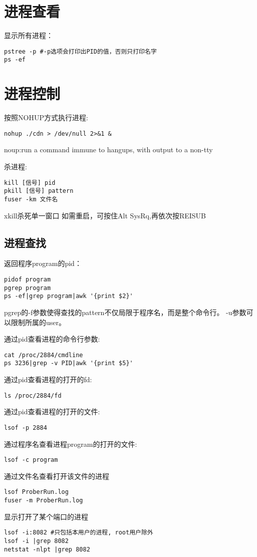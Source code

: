 \section{进程查看}
显示所有进程：
\begin{verbatim}
pstree -p #-p选项会打印出PID的值，否则只打印名字
ps -ef
\end{verbatim}


\section{进程控制}

按照NOHUP方式执行进程:
\begin{verbatim}
nohup ./cdn > /dev/null 2>&1 &
\end{verbatim}
noup:run a command immune to hangups, with output to a non-tty


杀进程:
\begin{verbatim}
kill [信号] pid
pkill [信号] pattern
fuser -km 文件名
\end{verbatim}

xkill杀死单一窗口
如需重启，可按住Alt SysRq,再依次按REISUB


\subsection{进程查找}

返回程序program的pid：
\begin{verbatim}
pidof program 
pgrep program 
ps -ef|grep program|awk '{print $2}'
\end{verbatim}
pgrep的-f参数使得查找的pattern不仅局限于程序名，而是整个命令行。 -u参数可以限制所属的user。

通过pid查看进程的命令行参数:
\begin{verbatim}
cat /proc/2884/cmdline
ps 3236|grep -v PID|awk '{print $5}'
\end{verbatim}

通过pid查看进程的打开的fd:
\begin{verbatim}
ls /proc/2884/fd
\end{verbatim}

通过pid查看进程的打开的文件:
\begin{verbatim}
lsof -p 2884
\end{verbatim}
通过程序名查看进程program的打开的文件:
\begin{verbatim}
lsof -c program 
\end{verbatim}

通过文件名查看打开该文件的进程
\begin{verbatim}
lsof ProberRun.log
fuser -m ProberRun.log
\end{verbatim}

显示打开了某个端口的进程
\begin{verbatim}
lsof -i:8082 #只包括本用户的进程, root用户除外
lsof -i |grep 8082
netstat -nlpt |grep 8082
\end{verbatim}




